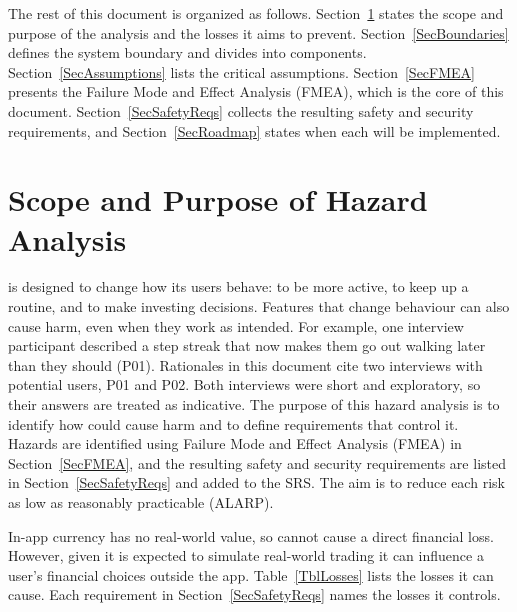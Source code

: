 \documentclass{article}
\begin{document}
The rest of this document is organized as follows.
Section~\ref{SecScopePurpose} states the scope and purpose of the analysis and
the losses it aims to prevent. Section~\ref{SecBoundaries} defines the system
boundary and divides \progname{} into components.
Section~\ref{SecAssumptions} lists the critical assumptions.
Section~\ref{SecFMEA} presents the Failure Mode and Effect Analysis (FMEA),
which is the core of this document. Section~\ref{SecSafetyReqs} collects the
resulting safety and security requirements, and Section~\ref{SecRoadmap}
states when each will be implemented.

\section{Scope and Purpose of Hazard Analysis} \label{SecScopePurpose}


\progname{} is designed to change how its users behave: to be more active, to
keep up a routine, and to make investing decisions. Features that change
behaviour can also cause harm, even when they work as intended. For example,
one interview participant described a step streak that now makes them go out
walking later than they should (P01). Rationales in this document cite two
interviews with potential users, P01 and P02. Both interviews were short and
exploratory, so their answers are treated as indicative. The purpose of this
hazard analysis is to identify how \progname{} could cause harm and to define
requirements that control it. Hazards are identified using Failure Mode and
Effect Analysis (FMEA) in Section~\ref{SecFMEA}, and the resulting safety and security
requirements are listed in Section~\ref{SecSafetyReqs} and added to the SRS.
The aim is to reduce each risk as low as reasonably practicable (ALARP).

In-app currency has no real-world value, so \progname{} cannot cause a direct
financial loss. However, given it is expected to simulate real-world trading it can influence a user's financial choices outside the app. Table~\ref{TblLosses} lists the losses it can cause. Each requirement in
Section~\ref{SecSafetyReqs} names the losses it controls.
\end{document}
